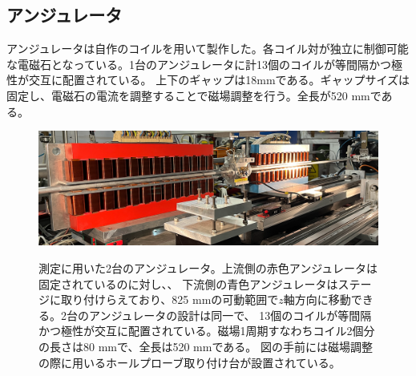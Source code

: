 \documentclass[a4paper,11pt,uplatex]{jsbook}
\begin{document}
\subsection{アンジュレータ}
アンジュレータは自作のコイルを用いて製作した。各コイル対が独立に制御可能な電磁石となっている。1台のアンジュレータに計13個のコイルが等間隔かつ極性が交互に配置されている。
上下のギャップは18mmである。ギャップサイズは固定し、電磁石の電流を調整することで磁場調整を行う。全長が520 mmである。
\begin{figure}[H]
  \centering
  \includegraphics[width=\linewidth]{image/3-undulator.png}\\
  \caption[アンジュレータ]{測定に用いた2台のアンジュレータ。上流側の赤色アンジュレータは固定されているのに対し、、
  下流側の青色アンジュレータはステージに取り付けらえており、825 mmの可動範囲で$z$軸方向に移動できる。2台のアンジュレータの設計は同一で、
  13個のコイルが等間隔かつ極性が交互に配置されている。磁場1周期すなわちコイル2個分の長さは80 mmで、全長は520 mmである。
  図の手前には磁場調整の際に用いるホールプローブ取り付け台が設置されている。} 
  \label{undulator}
\end{figure}
\end{document}
